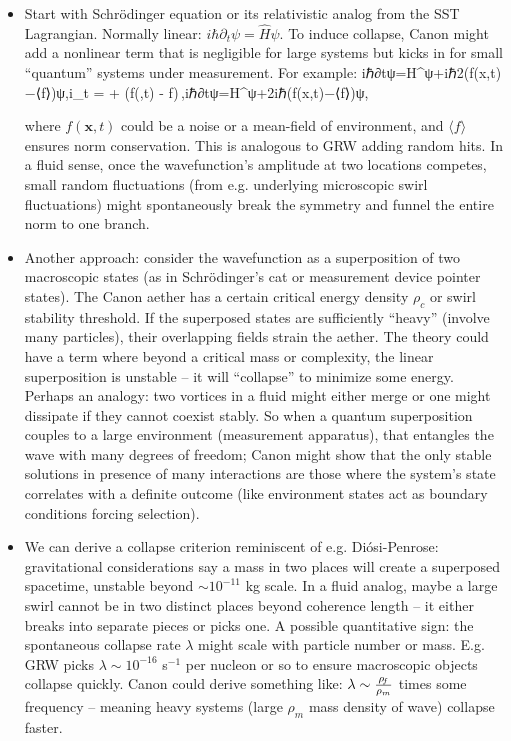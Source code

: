 \documentclass[11pt]{article}
\begin{document}
\begin{itemize}

\item 
Start with Schrödinger equation or its relativistic analog from the SST Lagrangian. Normally linear: $i\hbar\partial_t \psi = \hat{H}\psi$. To induce collapse, Canon might add a nonlinear term that is negligible for large systems but kicks in for small “quantum” systems under measurement. For example: iℏ∂tψ=H^ψ+iℏ2(f(x,t)−⟨f⟩)ψ,i\hbar \partial_t \psi = \psi + \big(f(,t) - \langle f\rangle\big)\psi\,,iℏ∂tψ=H^ψ+2iℏ(f(x,t)−⟨f⟩)ψ,

where $f(\mathbf{x},t)$ could be a noise or a mean-field of environment, and $\langle f\rangle$ ensures norm conservation. This is analogous to GRW adding random hits. In a fluid sense, once the wavefunction’s amplitude at two locations competes, small random fluctuations (from e.g. underlying microscopic swirl fluctuations) might spontaneously break the symmetry and funnel the entire norm to one branch.




\item 
Another approach: consider the wavefunction as a superposition of two macroscopic states (as in Schrödinger’s cat or measurement device pointer states). The Canon aether has a certain critical energy density $\rho_c$ or swirl stability threshold. If the superposed states are sufficiently “heavy” (involve many particles), their overlapping fields strain the aether. The theory could have a term where beyond a critical mass or complexity, the linear superposition is unstable – it will “collapse” to minimize some energy. Perhaps an analogy: two vortices in a fluid might either merge or one might dissipate if they cannot coexist stably. So when a quantum superposition couples to a large environment (measurement apparatus), that entangles the wave with many degrees of freedom; Canon might show that the only stable solutions in presence of many interactions are those where the system’s state correlates with a definite outcome (like environment states act as boundary conditions forcing selection).




\item 
We can derive a collapse criterion reminiscent of e.g. Diósi-Penrose: gravitational considerations say a mass in two places will create a superposed spacetime, unstable beyond $\sim 10^{-11}$ kg scale. In a fluid analog, maybe a large swirl cannot be in two distinct places beyond coherence length – it either breaks into separate pieces or picks one. A possible quantitative sign: the spontaneous collapse rate $\lambda$ might scale with particle number or mass. E.g. GRW picks $\lambda \sim 10^{-16}$ s$^{-1}$ per nucleon or so to ensure macroscopic objects collapse quickly. Canon could derive something like: $\lambda \sim \frac{\rho_{\!f}}{\rho_{m}}$ times some frequency – meaning heavy systems (large $\rho_m$ mass density of wave) collapse faster.





\end{itemize}
\end{document}
